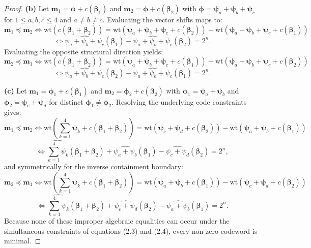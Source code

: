 \documentclass[pdflatex,sn-mathphys-num]{sn-jnl}%
\theoremstyle{thmstyleone}%
\theoremstyle{thmstyletwo}%
\theoremstyle{thmstylethree}%
\begin{document}
\begin{proof}
\textbf{(b)} Let $\mathbf{m}_1 = \boldsymbol{\phi} + c(\mathbf{\beta}_1)$ and $\mathbf{m}_2 = \boldsymbol{\phi} + c(\mathbf{\beta}_2)$ with $\boldsymbol{\phi} = \mathbf{\psi}_a + \mathbf{\psi}_b + \mathbf{\psi}_c$ for $1\leq a,b,c \leq 4$ and $a \neq b \neq c$. Evaluating the vector shifts maps to:
\[
\mathbf{m}_1 \preceq \mathbf{m}_2 \Leftrightarrow 
\mathrm{wt}(c(\mathbf{\beta}_1 + \mathbf{\beta}_2)) 
= \mathrm{wt}(\mathbf{\psi}_a + \mathbf{\psi}_b + \mathbf{\psi}_c + c(\mathbf{\beta}_2)) - \mathrm{wt}(\mathbf{\psi}_a + \mathbf{\psi}_b + \mathbf{\psi}_c + c(\mathbf{\beta}_1))
\]
\[
\Leftrightarrow \widehat{\psi_a + \psi_b + \psi_c}(\mathbf{\beta}_1) - \widehat{\psi_a + \psi_b + \psi_c}(\mathbf{\beta}_2) = 2^n.
\]
Evaluating the opposite structural direction yields:
\[
\mathbf{m}_2 \preceq \mathbf{m}_1 \Leftrightarrow 
\mathrm{wt}(c(\mathbf{\beta}_1 + \mathbf{\beta}_2)) 
= \mathrm{wt}(\mathbf{\psi}_a + \mathbf{\psi}_b + \mathbf{\psi}_c+ c(\mathbf{\beta}_1)) - \mathrm{wt}(\mathbf{\psi}_a + \mathbf{\psi}_b + \mathbf{\psi}_c + c(\mathbf{\beta}_2))
\]
\[
\Leftrightarrow \widehat{\psi_a + \psi_b + \psi_c}(\mathbf{\beta}_2) - \widehat{\psi_a + \psi_b + \psi_c}(\mathbf{\beta}_1) = 2^n.
\]

\textbf{(c)} Let $\mathbf{m}_1 = \boldsymbol{\phi}_1 + c(\mathbf{\beta}_1)$ and $\mathbf{m}_2 = \boldsymbol{\phi}_2 + c(\mathbf{\beta}_2)$ with $\boldsymbol{\phi}_1 = \mathbf{\psi}_a + \mathbf{\psi}_b$ and $\boldsymbol{\phi}_2 = \mathbf{\psi}_c + \mathbf{\psi}_d$ for distinct $\boldsymbol{\phi}_1 \neq \boldsymbol{\phi}_2$. Resolving the underlying code constraints gives:
\[
\mathbf{m}_1 \preceq \mathbf{m}_2 \Leftrightarrow 
\mathrm{wt}\!\left(\sum_{k=1}^{4} \mathbf{\psi}_k + c(\mathbf{\beta}_1 + \mathbf{\beta}_2)\right) 
= \mathrm{wt}(\mathbf{\psi}_c + \mathbf{\psi}_d + c(\mathbf{\beta}_2)) - \mathrm{wt}(\mathbf{\psi}_a + \mathbf{\psi}_b + c(\mathbf{\beta}_1))
\]
\[
\Leftrightarrow \widehat{\sum_{k=1}^{4} \psi_k}(\mathbf{\beta}_1 + \mathbf{\beta}_2) + \widehat{\psi_a + \psi_b}(\mathbf{\beta}_1) - \widehat{\psi_c + \psi_d}(\mathbf{\beta}_2) = 2^n,
\]
and symmetrically for the inverse containment boundary:
\[
\mathbf{m}_2 \preceq \mathbf{m}_1 \Leftrightarrow 
\mathrm{wt}\!\left(\sum_{k=1}^{4} \mathbf{\psi}_k + c(\mathbf{\beta}_1 + \mathbf{\beta}_2)\right) 
= \mathrm{wt}(\mathbf{\psi}_a + \mathbf{\psi}_b + c(\mathbf{\beta}_1)) - \mathrm{wt}(\mathbf{\psi}_c + \mathbf{\psi}_d + c(\mathbf{\beta}_2))
\]
\[
\Leftrightarrow\widehat{\sum_{k=1}^{4} \psi_k}(\mathbf{\beta}_1 + \mathbf{\beta}_2) +   \widehat{\psi_c + \psi_d}(\mathbf{\beta}_2) - \widehat{\psi_a + \psi_b}(\mathbf{\beta}_1) = 2^n.
\]
Because none of these improper algebraic equalities can occur under the simultaneous constraints of equations (2.3) and (2.4), every non-zero codeword is minimal.
\end{proof}
\end{document}
